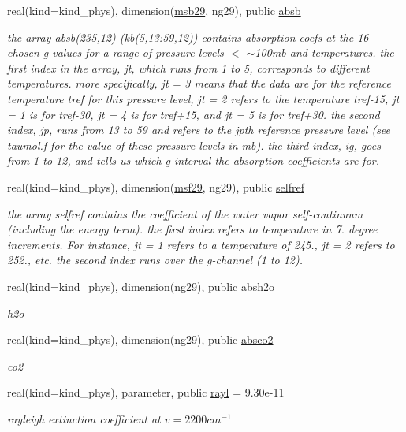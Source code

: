 \begin{Indent}
\begin{DoxyCompactItemize}
real(kind=kind\+\_\+phys), dimension(\hyperlink{group__module__radsw__kgbnn_gadd8e18a273d5fa133f22fb47c4d722da}{msb29}, ng29), public \hyperlink{group__module__radsw__kgbnn_gac9fb794bc4e4a02964b5e5d1431c31c3}{absb}
\begin{DoxyCompactList}\small\item\em the array absb(235,12) (kb(5,13\+:59,12)) contains absorption coefs at the 16 chosen g-\/values for a range of pressure levels $<$ $\sim$100mb and temperatures. the first index in the array, jt, which runs from 1 to 5, corresponds to different temperatures. more specifically, jt = 3 means that the data are for the reference temperature tref for this pressure level, jt = 2 refers to the temperature tref-\/15, jt = 1 is for tref-\/30, jt = 4 is for tref+15, and jt = 5 is for tref+30. the second index, jp, runs from 13 to 59 and refers to the jpth reference pressure level (see taumol.\+f for the value of these pressure levels in mb). the third index, ig, goes from 1 to 12, and tells us which g-\/interval the absorption coefficients are for. \end{DoxyCompactList}\item 
real(kind=kind\+\_\+phys), dimension(\hyperlink{group__module__radsw__kgbnn_gace849342fcb0d18d825318a2ee26ce0e}{msf29}, ng29), public \hyperlink{group__module__radsw__kgbnn_ga468e2dd6001734d10784c8fb7b5df4e3}{selfref}
\begin{DoxyCompactList}\small\item\em the array selfref contains the coefficient of the water vapor self-\/continuum (including the energy term). the first index refers to temperature in 7. degree increments. For instance, jt = 1 refers to a temperature of 245., jt = 2 refers to 252., etc. the second index runs over the g-\/channel (1 to 12). \end{DoxyCompactList}\item 
real(kind=kind\+\_\+phys), dimension(ng29), public \hyperlink{group__module__radsw__kgbnn_gacab70725ca7faf002f04306fe1798e02}{absh2o}
\begin{DoxyCompactList}\small\item\em h2o \end{DoxyCompactList}\item 
real(kind=kind\+\_\+phys), dimension(ng29), public \hyperlink{group__module__radsw__kgbnn_gaa9a57e32dfbb8979478aa8c931ff0e2d}{absco2}
\begin{DoxyCompactList}\small\item\em co2 \end{DoxyCompactList}\item 
real(kind=kind\+\_\+phys), parameter, public \hyperlink{group__module__radsw__kgbnn_gabc0a41a10d73674e124115fe0511cc23}{rayl} = 9.\+30e-\/11
\begin{DoxyCompactList}\small\item\em rayleigh extinction coefficient at $v=2200cm^{-1}$ \end{DoxyCompactList}\end{DoxyCompactItemize}
\end{Indent}
